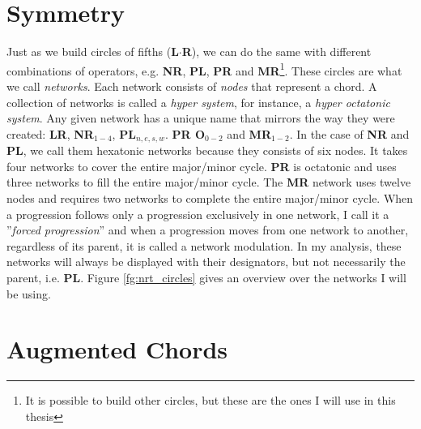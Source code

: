 \section{Symmetry}
Just as we build circles of fifths (\textbf{L\(\cdot\)R}), we can do the same with different combinations of operators, e.g. \textbf{NR}, \textbf{PL}, \textbf{PR} and \textbf{MR}\footnote{It is possible to build other circles, but these are the ones I will use in this thesis}. These circles are what we call \textit{networks}. Each network consists of \textit{nodes} that represent a chord. A collection of networks is called a \textit{hyper system}, for instance, a \textit{hyper octatonic system}. Any given network has a unique name that mirrors the way they were created: \textbf{LR}, \textbf{NR\(_{1-4}\)}, \textbf{PL\(_{n,e,s,w}\)}. \textbf{PR O\(_{0-2}\)} and \textbf{MR\(_{1-2}\)}. In the case of \textbf{NR} and \textbf{PL}, we call them hexatonic networks because they consists of six nodes. It takes four networks to cover the entire major/minor cycle. \textbf{PR} is octatonic and uses three networks to fill the entire major/minor cycle. The \textbf{MR} network uses twelve nodes and requires two networks to complete the entire major/minor cycle. When a progression follows only a progression exclusively in one network, I call it a ''\textit{forced progression}'' and when a progression moves from one network to another, regardless of its parent, it is called a network modulation. In my analysis, these networks will always be displayed with their designators, but not necessarily the parent, i.e. \textbf{PL}. Figure \ref{fg:nrt_circles} gives an overview over the networks I will be using. 


	

\section{Augmented Chords} 


